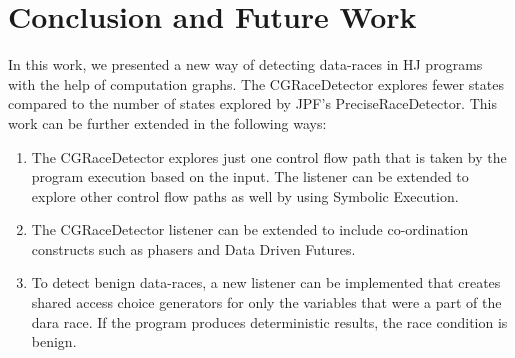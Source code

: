 \section{Conclusion and Future Work}
In this work, we presented a new way of detecting data-races in HJ programs with the help of computation graphs. The CGRaceDetector explores fewer states compared to the number of states explored by JPF's PreciseRaceDetector. This work can be further extended in the following ways:
\begin{enumerate}
\item The CGRaceDetector explores just one control flow path that is taken by the program execution based on the input. The listener can be extended to explore other control flow paths as well by using Symbolic Execution.
\item The CGRaceDetector listener can be extended to include co-ordination constructs such as phasers and Data Driven Futures.
\item To detect benign data-races, a new listener can be implemented that creates shared access choice generators for only the variables that were a part of the dara race. If the program produces deterministic results, the race condition is benign.
\end{enumerate}
